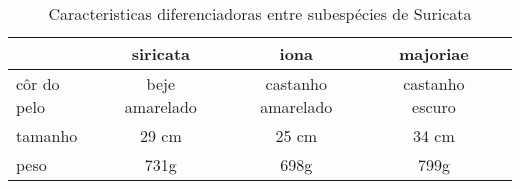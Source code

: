\documentclass[a4paper,11pt]{report}
\begin{document}
\begin{table}[]
\caption{Caracteristicas diferenciadoras entre subespécies de Suricata}

\begin{tabular}{|l || c | c | c |c|} \hline
 & siricata & iona & majoriae \\ \hline
côr do pelo & beje amarelado & castanho amarelado  & castanho escuro \\ \hline
tamanho & 29 cm & 25 cm & 34 cm \\ \hline
peso & 731g & 698g  & 799g \\ \hline
\end{tabular}
\end {table}
\end{document}
